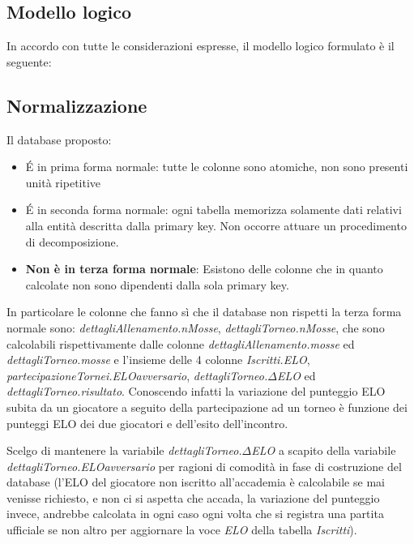 \documentclass{article}
\begin{document}
    \newpage

    \subsection{Modello logico}

    In accordo con tutte le considerazioni espresse, il modello logico formulato è il seguente:

    \begin{center}
    \end{center}

    \subsection{Normalizzazione}

    Il database proposto:
    \begin{itemize}
        \item \'E in prima forma normale: tutte le colonne sono atomiche, non sono presenti unità ripetitive
        \item \'E in seconda forma normale: ogni tabella memorizza solamente dati relativi alla entità descritta dalla primary key. Non occorre attuare un procedimento di decomposizione.
        \item \textbf{Non è in terza forma normale}: Esistono delle colonne che in quanto calcolate non sono dipendenti dalla sola primary key.
    \end{itemize}
    In particolare le colonne che fanno sì che il database non rispetti la terza forma normale sono: \textit{dettagliAllenamento.nMosse}, \textit{dettagliTorneo.nMosse}, che sono calcolabili rispettivamente dalle colonne \textit{dettagliAllenamento.mosse} ed \textit{dettagliTorneo.mosse} e l'insieme delle 4 colonne \textit{Iscritti.ELO}, \textit{partecipazioneTornei.ELOavversario}, \textit{dettagliTorneo.$\Delta$ELO} ed \textit{dettagliTorneo.risultato}. Conoscendo infatti la variazione del punteggio ELO subita da un giocatore a seguito della partecipazione ad un torneo è funzione dei punteggi ELO dei due giocatori e dell'esito dell'incontro.

    Scelgo di mantenere la variabile \textit{dettagliTorneo.$\Delta$ELO} a scapito della variabile \textit{dettagliTorneo.ELOavversario} per ragioni di comodità in fase di costruzione del database (l'ELO del giocatore non iscritto all'accademia è calcolabile se mai venisse richiesto, e non ci si aspetta che accada, la variazione del punteggio invece, andrebbe calcolata in ogni caso ogni volta che si registra una partita ufficiale se non altro per aggiornare la voce \textit{ELO} della tabella \textit{Iscritti}).
\end{document}
